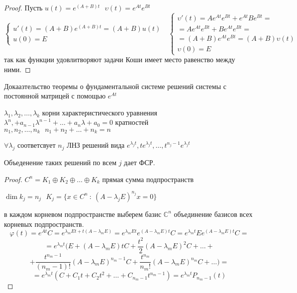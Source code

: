 \begin{block}[Свойства]
  \begin{proof}
    Пусть $u(t) = e^{(A+B)t} ~~~ \upsilon(t) = e^{At}e^{Bt}$
    $$
    \left\{
    \begin{array}{l}
      u'(t) = (A+B) e^{(A+B)t} = (A+B)u(t) \\
      u(0) = E
    \end{array}
    \right. ~~~
    \left\{
    \begin{array}{l}
      \upsilon'(t) = A e^{At} e^{Bt} + e^{At} B e^{Bt} = \\
      = A e^{At} e^{Bt} + B e^{At} e^{Bt} = \\
      = (A+B) e^{At} e^{Bt} =(A+B)\upsilon(t) \\
      \upsilon(0) = E
    \end{array}
    \right.
    $$
    так как функции удовлитворяют задачи Коши имеет место равенство между ними.
  \end{proof}
\end{block}

\begin{title}[\Large]
  Докаазтельство теоремы о фундаментальной системе решений системы с постоянной
  матрицей с помощью $e^{At}$
\end{title}

\begin{theorem}
  $\lambda_1, \lambda_2, \ldots, \lambda_k$ корни характеристического уравнения
  $\lambda^n, + a_{n-1} \lambda^{n-1} + \ldots + a_n \lambda + a_0 = 0$
  кратностей $n_1, n_2, \ldots, n_k ~~~ n_1 + n_2 + \ldots + n_k = n$

  $\forall \lambda_j$ соответсвует $n_j$ ЛНЗ решений вида
  $e^{\lambda_j t}, te^{\lambda_j t}, \ldots, t^{n_j-1} e^{\lambda_j t}$

  Объеденение таких решений по всем $j$ дает ФСР.
\end{theorem}

\begin{proof}
  $C^n = K_1 \oplus K_2 \oplus \ldots \oplus K_k$ прямая сумма подпространств

  $\dim k_j = n_j ~~~ K_j = \{x \in C^n ~:~ (A - \lambda_jE)^{n_j}x = 0\}$

  в каждом корневом подпространстве выберем базис $\mathbb{C}^n$ объединение
  базисов всех корневых подпространств.
  $$
  \varphi(t) = e^{At} C = e^{\lambda_m Et + t(A - \lambda_m E)} =
  e^{\lambda_mEt} e^{(A - \lambda_mE)t}C =
  e^{\lambda_mt} E e^{(A - \lambda_mE)t}C =
  $$
  $$
  = e^{\lambda_m t}(E + (A-\lambda_m E)t C + \frac{t^2}{2}(A-\lambda_mE)^2C
  + \ldots +
  $$
  $$
  + \frac{t^{n_m -1}}{(n_m-1)!}(A-\lambda_mE)^{n_m -1}C +
  \frac{t^{n_m}}{n_m!}(A - \lambda_m E)^{n_m}C + \ldots ) =
  $$
  $$
  = e^{\lambda_m t}(C + C_1 t + C_2 t^2 + \ldots + C_{n_m-1}t^{n_m-1}) =
  e^{\lambda_m t} P_{n_m-1}(t)
  $$
\end{proof}

